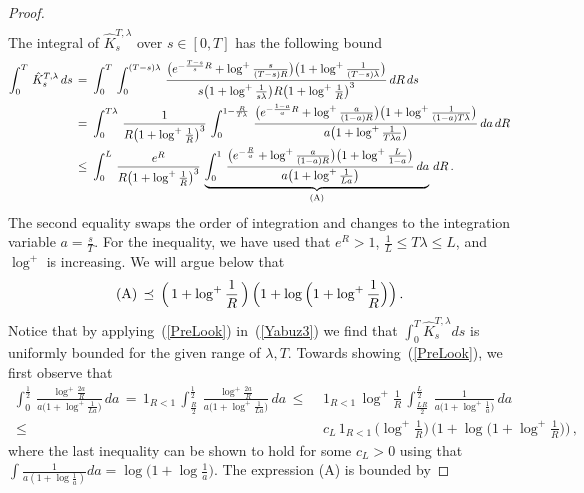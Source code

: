 \documentclass[10pt]{article}
\numberwithin{equation}{section}
\theoremstyle{definition}
\begin{document}
\begin{proof}
\begin{align*}
    \end{align*}
The integral of $ \hat{K}_s^{T,\lambda}$ over $s\in [0,T]$ has the following bound
\begin{align}  \label{Yabuz3}
\int_0^T\,   \hat{K}_s^{T,\lambda}\,ds \, =\,& \, \int_0^T \,\int_{0  }^{(T-s)\lambda} \, \frac{\big(e^{-\frac{T-s}{s}R}+\log^{+}\frac{s}{(T-s)R}  \big) \big(1+\log^+\frac{1}{(T-s)\lambda}  \big)  }{s\big( 1+ \log^+ \frac{1}{s\lambda } \big)R\big(1+\log^+ \frac{1}{R}  \big)^3 }\,dR \, ds \nonumber  \\
 \, =\,& \,\int_{0  }^{T\lambda} \, \frac{1 }{R\big(1+\log^+ \frac{1 }{R}  \big)^3 } \,\int_0^{1-\frac{R}{T\lambda}} \, \frac{\big( e^{-\frac{1-a}{a}R}+\log^{+}\frac{a}{(1-a)R}  \big) \big(1+\log^+\frac{1}{(1-a)T\lambda} \big) }{a\big( 1+ \log^+ \frac{1}{T\lambda a} \big)}\,  da\, dR  \nonumber  \\
 \, \leq \,& \,\int_{0  }^{L} \, \frac{e^R }{R\big(1+\log^+ \frac{1 }{R}  \big)^3 }\, \underbrace{\int_0^{1}\,  \frac{\big( e^{-\frac{R}{a}}+\log^{+}\frac{a}{(1-a)R}  \big) \big(1+\log^+\frac{L}{1-a} \big)}{a\big( 1+ \log^+ \frac{1}{L a} \big)}\,   da}_{\textup{(A)}}\, dR     \,.
\end{align}
The second equality swaps the order of integration and changes to the integration variable $a=\frac{s}{T}$.  For the inequality, we have used  that $e^R>1$, $\frac{1}{L}\leq T\lambda\leq L$, and  $\log^+$ is increasing.  We will argue below that 
\begin{align}\label{PreLook}
\textup{(A)}\,\preceq  \,\Big(\,1+\log^+\frac{1}{R} \,\Big)\,\Big(1+\log\Big(1+\log^+\frac{1}{R}\Big)\Big)\,.
\end{align}
Notice that by applying~(\ref{PreLook}) in~(\ref{Yabuz3}) we find that $\int_0^T   \hat{K}_s^{T,\lambda}ds $ is uniformly bounded for the given range of $\lambda,T$.  Towards showing~(\ref{PreLook}), we first observe that
\begin{align}\label{Intermed}
 \int_0^{\frac{1}{2}} \,\frac{ \log^{+}\frac{2a}{R} }{a\big( 1+ \log^+ \frac{1}{L a} \big)}\, da \,=\,1_{R< 1 }\,\int_{\frac{R}{2} }^{\frac{1}{2}} \,\frac{ \log^+\frac{2a}{R} }{a\big( 1+ \log^+ \frac{1}{L a} \big)}\, da  
 \,\leq  \,&\,1_{R< 1 }\,\log^+\frac{1}{R}\,\int_{\frac{LR}{2} }^{\frac{L}{2}} \,\frac{ 1 }{a\big( 1+ \log^+ \frac{1}{a} \big)}\, da   \nonumber
   \\
 \,\leq\,&\,c_L\, 1_{R< 1 }\,\Big(\log^+\frac{1}{R}\Big)\,\Big(1+\log\Big(1+\log^+\frac{1}{R}\Big)\Big)\,,
\end{align}
where the last inequality can be shown to hold for some $c_L>0$ using that $\int \frac{1}{a (1+\log \frac{1}{a})  }da= \log\big(1+\log \frac{1}{a}\big)$.  The expression (A)  is bounded by

\end{proof}
\end{document}
